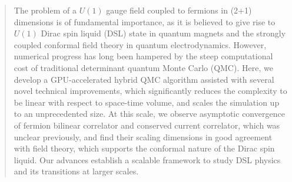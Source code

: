 \documentclass[aps,prl,twocolumn,superscriptaddress,showpacs,longbibliography]{revtex4-2}
\newcommand{\qed}{QED$_3$}
\begin{document}
\begin{abstract}
The problem of a $U(1)$ gauge field coupled to fermions in (2+1) dimensions is of fundamental importance, as it is believed to give rise to $U(1)$ Dirac spin liquid (DSL) state in quantum magnets and the strongly coupled conformal field theory in quantum electrodynamics. However, numerical progress has long been hampered by the steep computational cost of traditional determinant quantum Monte Carlo (QMC). Here, we develop a GPU-accelerated hybrid QMC algorithm assisted with several novel technical improvements, which significantly reduces the complexity to be linear with respect to space-time volume, and scales the simulation up to an unprecedented size.
At this scale, we observe asymptotic convergence of fermion bilinear correlator and conserved current correlator, which was unclear previously, and find their scaling dimensions in good agreement with field theory, which supports the conformal nature of the Dirac spin liquid. Our advances establish a scalable framework to study DSL physics and its transitions at larger scales.
\end{abstract}
\end{document}

